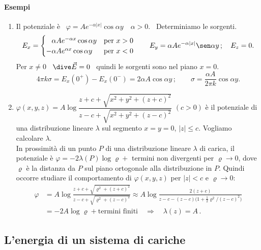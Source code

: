 \paragraph{Esempi}
\begin{enumerate}
  \item Il potenziale \`e \ $\varphi=Ae^{-\alpha|x|}\cos\alpha y\quad\alpha>0$.
    \ Determiniamo le sorgenti.
    \[
      E_x=\begin{cases}\phantom{-}\alpha Ae^{-\alpha x}\cos\alpha y
      &\text{per }x>0\\ -\alpha Ae^{\alpha x}\cos\alpha y
      &\text{per }x<0\end{cases}
      \qquad E_y=\alpha Ae^{-\alpha|x|}\sen\alpha y\,;\quad E_z=0.
    \]
    Per $x\neq0$ \ $\dive\vec E=0$ \ quindi le sorgenti sono nel piano $x=0$.
    \[
      4\pi k\sigma=E_x(0^+)-E_x(0^-)=2\alpha A\cos\alpha y\,;
      \qquad\sigma=\frac{\alpha A}{2\pi k}\cos\alpha y.
    \]
  \item $\varphi(x,y,z)=A\log\dfrac{z+c+\sqrt{x^2+y^2+(z+c)^2}}
      {z-c+\sqrt{x^2+y^2+(z-c)^2}}$ \quad $(c>0)$ \quad \`e il potenziale di
    una distribuzione lineare $\lambda$ sul segmento $x=y=0$, $|z|\le c$.
    Vogliamo calcolare $\lambda$.\\
    In prossimit\`a di un punto $P$ di una distribuzione lineare $\lambda$ di
    carica, il potenziale \`e $\varphi=-2\lambda(P)\log\varrho+{}$ termini non
    divergenti per $\varrho\to0$, dove $\varrho$ \`e la distanza da $P$ sul
    piano ortogonale alla distribuzione in $P$. Quindi occorre studiare il
    comportamento di $\varphi(x,y,z)$ per $|z|<c$ e $\varrho\to0$:
    \[
      \begin{split}
        \varphi&=A\log\frac{z+c+\sqrt{\varrho^2+(z+c)^2}}
          {z-c+\sqrt{\varrho^2+(z-c)^2}}
        \approx A\log\frac{2(z+c)}
          {z-c-(z-c)\big(1+\frac12\varrho^2/(z-c)^2\big)}\\
        &=-2A\log\varrho+\text{termini finiti}
        \quad\Rightarrow\quad\lambda(z)=A\,.
      \end{split}
    \]
\end{enumerate}

\subsection{L'energia di un sistema di cariche}

